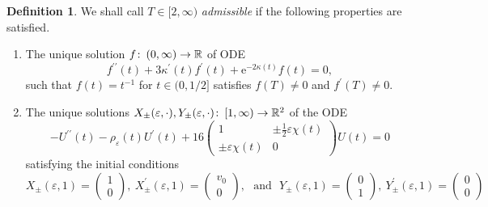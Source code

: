 \documentclass{article}
\numberwithin{equation}{section}        %
\theoremstyle{bfnote}
\theoremstyle{definition}
\newtheorem{Def}[thm]{Definition}           %
\theoremstyle{bfremark}
\newcommand{\col}{\colon \thinspace}        %
\newcommand{\R}{\mathbb{R}}                 %
\begin{document}
\begin{Def}     \label{Def: Admissible values}
    We shall call $T \in [2,\infty)$ \emph{admissible} if the following properties are satisfied.
    \begin{enumerate}
        \item The unique solution $f \col (0,\infty) \rightarrow \R$ of ODE
        \begin{equation*}
            f^{\prime\prime}(t) + 3 \kappa^\prime(t) f^\prime(t) + \mathrm{e}^{-2\kappa(t)} f(t) = 0 ,
        \end{equation*}
        such that $f(t) = t^{-1}$ for $t \in (0,1/2]$ satisfies $f(T) \neq 0$ and $f^\prime(T) \neq 0$.

        \item The unique solutions $X_\pm(\varepsilon,\cdot), Y_\pm(\varepsilon,\cdot) \col [1,\infty) \rightarrow \R^2$ of the ODE
            \begin{equation*}
                - U^{\prime\prime}(t) - \rho_\varepsilon(t) U^\prime(t) + 16 \begin{pmatrix} 1 & \pm \frac{1}{2} \varepsilon \chi(t) \\ \pm \varepsilon \chi(t) & 0 \end{pmatrix} U(t) = 0
            \end{equation*}
            satisfying the initial conditions
            \begin{equation*}
                X_\pm(\varepsilon,1) = 
                \begin{pmatrix}
                    1 \\
                    0
                \end{pmatrix}, ~ X^\prime_\pm(\varepsilon,1) = 
                \begin{pmatrix}
                    v_0 \\
                    0
                \end{pmatrix}, ~~~ \text{and} ~~~ Y_\pm(\varepsilon,1) = 
                \begin{pmatrix}
                    0\\
                    1
                \end{pmatrix}, ~ Y^\prime_\pm(\varepsilon,1) = 
                \begin{pmatrix}
                    0\\
                    0
                \end{pmatrix}
            \end{equation*}

\end{enumerate}
\end{Def}
\end{document}
